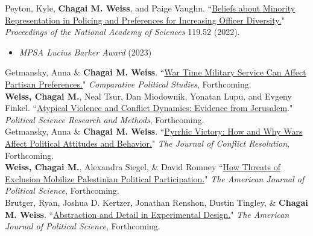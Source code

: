 \documentclass[11pt]{article}
\begin{document}
Peyton, Kyle, \textbf{Chagai M. Weiss}, and Paige Vaughn. ``\href{https://www.pnas.org/doi/10.1073/pnas.2213986119}{Beliefs about Minority Representation in Policing and Preferences for Increasing Officer Diversity.}" \emph{Proceedings of the National Academy of Sciences} 119.52 (2022).
 \begin{itemize}[label=$\star$]
 \item \emph{MPSA Lucius Barker Award} (2023)
\end{itemize}

Getmansky, Anna \& \textbf{Chagai M. Weiss}. ``\href{https://journals.sagepub.com/doi/10.1177/00104140221141837}{War Time Military Service Can Affect Partisan Preferences.}" \emph{Comparative Political Studies}, Forthcoming.\\

\textbf{Weiss, Chagai M.}, Neal Tsur, Dan Miodownik, Yonatan Lupu, and Evgeny Finkel. ``\href{https://www.cambridge.org/core/journals/political-science-research-and-methods/article/atypical-violence-and-conflict-dynamics-evidence-from-jerusalem/689731DDDA2C0B9C818911C86B472460}{Atypical Violence and Conflict Dynamics: Evidence from Jerusalem}." \emph{Political Science Research and Methods}, Forthcoming.\\


Getmansky, Anna \& \textbf{Chagai M. Weiss}. ``\href{https://journals.sagepub.com/doi/10.1177/00220027221114086}{Pyrrhic Victory: How and Why Wars Affect Political Attitudes and Behavior.}"  \emph{The Journal of Conflict Resolution}, Forthcoming.\\

\textbf{Weiss, Chagai M.}, Alexandra Siegel, \& David Romney ``\href{https://onlinelibrary.wiley.com/doi/full/10.1111/ajps.12718}{How Threats of Exclusion Mobilize Palestinian Political Participation.}" \emph{The American Journal of Political Science}, Forthcoming.\\

Brutger, Ryan, Joshua D. Kertzer, Jonathan Renshon, Dustin Tingley, \& \textbf{Chagai M. Weiss}. ``\href{https://onlinelibrary.wiley.com/doi/full/10.1111/ajps.12710}{Abstraction and Detail in Experimental Design.}" \emph{The American Journal of Political Science}, Forthcoming.\\
\end{document}
